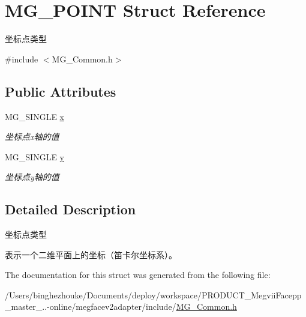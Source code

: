 \hypertarget{struct_m_g___p_o_i_n_t}{}\section{M\+G\+\_\+\+P\+O\+I\+NT Struct Reference}
\label{struct_m_g___p_o_i_n_t}


坐标点类型  




{\ttfamily \#include $<$M\+G\+\_\+\+Common.\+h$>$}

\subsection*{Public Attributes}
\begin{DoxyCompactItemize}
\item 
\mbox{\label{struct_m_g___p_o_i_n_t_ab66497ca58ea473612e15b84ced15e78}} 
M\+G\+\_\+\+S\+I\+N\+G\+LE \hyperlink{struct_m_g___p_o_i_n_t_ab66497ca58ea473612e15b84ced15e78}{x}
\begin{DoxyCompactList}\small\item\em 坐标点x轴的值 \end{DoxyCompactList}\item 
\mbox{\label{struct_m_g___p_o_i_n_t_ab3d4c93f21ed312d4d4d2df3508d4e11}} 
M\+G\+\_\+\+S\+I\+N\+G\+LE \hyperlink{struct_m_g___p_o_i_n_t_ab3d4c93f21ed312d4d4d2df3508d4e11}{y}
\begin{DoxyCompactList}\small\item\em 坐标点y轴的值 \end{DoxyCompactList}\end{DoxyCompactItemize}


\subsection{Detailed Description}
坐标点类型 

表示一个二维平面上的坐标（笛卡尔坐标系）。 

The documentation for this struct was generated from the following file\+:\begin{DoxyCompactItemize}
\item 
/\+Users/binghezhouke/\+Documents/deploy/workspace/\+P\+R\+O\+D\+U\+C\+T\+\_\+\+Megvii\+Facepp\+\_\+master\+\_..-\/online/megfacev2adapter/include/\hyperlink{_m_g___common_8h}{M\+G\+\_\+\+Common.\+h}\end{DoxyCompactItemize}
